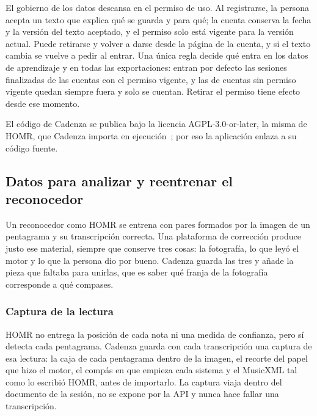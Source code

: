 \documentclass[conference]{IEEEtran}
\begin{document}
El gobierno de los datos descansa en el permiso de uso. Al registrarse, la
persona acepta un texto que explica qué se guarda y para qué; la cuenta
conserva la fecha y la versión del texto aceptado, y el permiso solo está
vigente para la versión actual. Puede retirarse y volver a darse desde la
página de la cuenta, y si el texto cambia se vuelve a pedir al entrar.
Una única regla decide qué entra en los datos de aprendizaje y en todas las
exportaciones: entran por defecto las sesiones finalizadas de las cuentas
con el permiso vigente, y las de cuentas sin permiso vigente quedan
siempre fuera y solo se cuentan. Retirar el permiso tiene efecto desde ese
momento.

El código de Cadenza se publica bajo la licencia AGPL-3.0-or-later, la
misma de HOMR, que Cadenza importa en ejecución~\cite{agpl3}; por eso la
aplicación enlaza a su código fuente.

\subsection{Datos para analizar y reentrenar el reconocedor}
\label{subsec:datos-lector}

Un reconocedor como HOMR se entrena con pares formados por la imagen de un
pentagrama y su transcripción correcta. Una plataforma de corrección
produce justo ese material, siempre que conserve tres cosas: la
fotografía, lo que leyó el motor y lo que la persona dio por bueno. Cadenza
guarda las tres y añade la pieza que faltaba para unirlas, que es saber
qué franja de la fotografía corresponde a qué compases.

\subsubsection{Captura de la lectura}
HOMR no entrega la posición de cada nota ni una medida de confianza, pero
sí detecta cada pentagrama. Cadenza guarda con cada transcripción una
captura de esa lectura: la caja de cada pentagrama dentro de la imagen, el
recorte del papel que hizo el motor, el compás en que empieza cada sistema
y el MusicXML tal como lo escribió HOMR, antes de importarlo. La captura
viaja dentro del documento de la sesión, no se expone por la API y nunca
hace fallar una transcripción.
\end{document}
